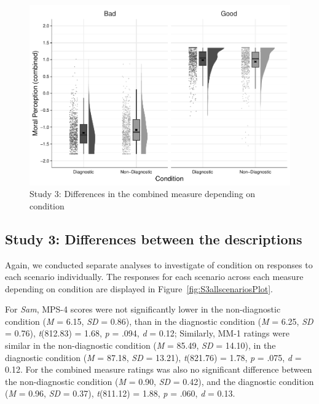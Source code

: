 \documentclass[
  man,floatsintext]{apa6}
\begin{document}
\begin{figure}[!h]
\includegraphics[width=\textwidth,]{Supplementary_files/figure-latex/S3combinedplot-1} \caption{Study 3: Differences in the combined measure depending on condition}\label{fig:S3combinedplot}
\end{figure}

\newpage

\subsection{Study 3: Differences between the descriptions}\label{study-3-differences-between-the-descriptions}

Again, we conducted separate analyses to investigate of condition on responses to each scenario individually. The responses for each scenario across each measure depending on condition are displayed in Figure~\ref{fig:S3allscenariosPlot}.

For \emph{Sam}, MPS-4 scores were not significantly lower in the non-diagnostic condition (\emph{M} = 6.15, \emph{SD} = 0.86), than in the diagnostic condition (\emph{M} = 6.25, \emph{SD} = 0.76), \emph{t}(812.83) = 1.68, \emph{p} = .094, \emph{d} = 0.12; Similarly, MM-1 ratings were similar in the non-diagnostic condition (\emph{M} = 85.49, \emph{SD} = 14.10), in the diagnostic condition (\emph{M} = 87.18, \emph{SD} = 13.21), \emph{t}(821.76) = 1.78, \emph{p} = .075, \emph{d} = 0.12. For the combined measure ratings was also no significant difference between the non-diagnostic condition (\emph{M} = 0.90, \emph{SD} = 0.42), and the diagnostic condition (\emph{M} = 0.96, \emph{SD} = 0.37), \emph{t}(811.12) = 1.88, \emph{p} = .060, \emph{d} = 0.13.
\end{document}
